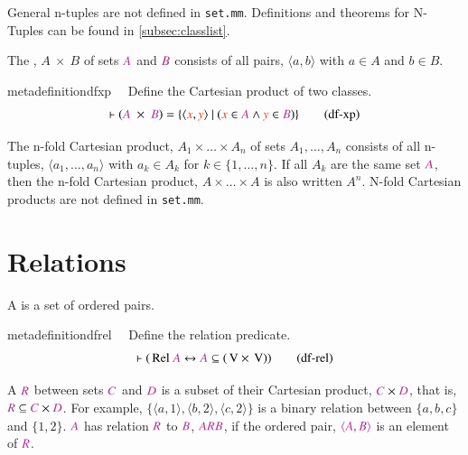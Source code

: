 \pn General n-tuples are not defined in \texttt{set.mm}.  Definitions and theorems for N-Tuples can be found in \ref{subsec:classlist}.

\pn The , $A~\times~ B$ of sets $\mc{A}$ and $\mc{B}$ consists of all pairs, $\langle a,b\rangle$ with $a\in A$ and $b\in B$.  
\begin{restatable}{metadefinition}{dfxp}~~ Define the Cartesian product of two
classes.    ~
\begin{align}
\vdash ( \mc{A}~\times~\mc{B} ) = \{ \langle \msc{x} , \msc{y} \rangle~\vert~(
    \msc{x} \in \mc{A} \wedge \msc{y} \in \mc{B} )
    \}\label{eq:df-xp}\tag{df-xp}
\end{align}
\end{restatable}


\pn The n-fold Cartesian product, $A_1\times\ldots\times A_n$ of sets $A_1,\ldots,A_n$ consists of all n-tuples, 
$\langle a_1,\ldots,a_n\rangle$ with $a_k\in A_k$ for $k\in\{1,\ldots,n\}$.  If all $A_k$ are the same set $\mc{A}$, then the n-fold Cartesian product, $A\times\ldots\times A$ is also written $A^n$.  
N-fold Cartesian products are not defined in \texttt{set.mm}.

\section{Relations}\label{sec:relationsmath}

A  is a set of ordered pairs.

\begin{restatable}{metadefinition}{dfrel}~~ Define the relation predicate. 
\begin{align}
\vdash ( \,\mathrm{Rel}~ \mc{A} \leftrightarrow \mc{A} \subseteq ( \,\mathrm{V}
    \times \,\mathrm{V} ) )\label{eq:df-rel}\tag{df-rel}
\end{align}
\end{restatable}

\pn A   $\mc{R}$ between sets $\mc{C}$ and $\mc{D}$ is a subset of their Cartesian product, $\mc{C}\times \mc{D}$, that is, 
$\mc{R}\subseteq \mc{C}\times \mc{D}$.   For example,
\(\{\langle a,1\rangle,\langle b,2\rangle,\langle c,2\rangle\}\)
is a binary relation between $\{a,b,c\}$ and $\{1,2\}$.  $\mc{A}$ has relation $\mc{R}$ to $\mc{B}$, $\mc{ARB}$, if the ordered pair,
$\mc{\langle A,B\rangle}$ is an element of $\mc{R}$.

